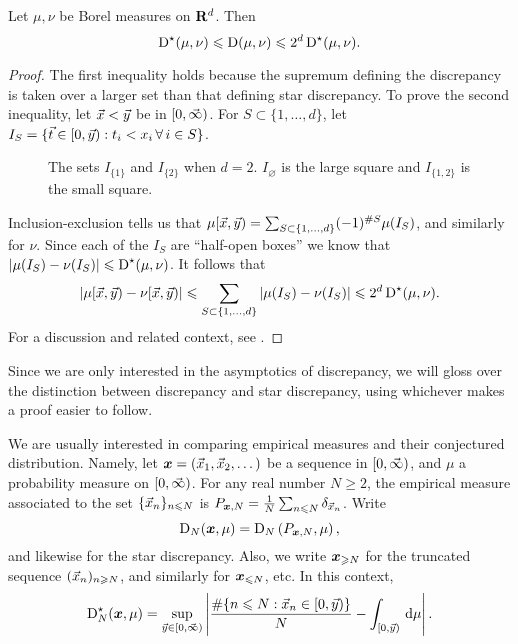\begin{lemma}
Let $\mu,\nu$ be Borel measures on $\mathbf{R}^d$. Then 
\[
	\operatorname{D}^\star(\mu,\nu) \leqslant \operatorname{D}(\mu,\nu) \leqslant 2^d \operatorname{D}^\star(\mu,\nu) .
\]
\end{lemma}
\begin{proof}
The first inequality holds because the supremum defining the discrepancy is 
taken over a larger set than that defining star discrepancy. To prove the 
second inequality, let $\vec{x}<\vec{y}$ be in $[0,\vec{\infty})$. For 
$S\subset \{1,\dots,d\}$, let 
$I_S = \{ \vec{t} \in [0,\vec{y}) : t_i < x_i \,\forall\,i\in S\}$.
\begin{figure}[h]
\caption{The sets $I_{\{1\}}$ and $I_{\{2\}}$ when $d = 2$. $I_\varnothing$ is 
the large square and $I_{\{1,2\}}$ is the small square.}
\centering
{}
\end{figure}
Inclusion-exclusion tells us that 
$\mu[\vec{x},\vec{y}) = \sum_{S\subset \{1,\dots,d\}} (-1)^{\# S} \mu(I_S)$, 
and similarly for $\nu$. Since each of the $I_S$ are ``half-open boxes'' 
we know that $|\mu(I_S) - \nu(I_S)| \leqslant \operatorname{D}^\star(\mu,\nu)$. It 
follows that 
\[
	|\mu[\vec{x},\vec{y}) - \nu[\vec{x},\vec{y})| \leqslant \sum_{S\subset \{1,\dots,d\}} |\mu(I_S) - \nu(I_S)| \leqslant 2^d \operatorname{D}^\star(\mu,\nu) .
\]
For a discussion and related context, see 
\cite[Ch.~2 Ex.~1.2]{kuipers-niederreiter-1974}. 
\end{proof}

Since we are only interested in the asymptotics of discrepancy, we will 
gloss over the distinction between discrepancy and star discrepancy, using 
whichever makes a proof easier to follow. 

We are usually interested in comparing empirical measures and their conjectured 
distribution. Namely, let ${\boldsymbol x} = (\vec{x}_1,\vec{x}_2,\dots)$ be a sequence in 
$[0,\vec{\infty})$, and $\mu$ a probability measure on $[0,\vec{\infty})$. For any real 
number $N\geqslant 2$, the empirical measure associated to the set 
$\{\vec{x}_n\}_{n\leqslant N}$ is 
$P_{{\boldsymbol x},N} = \frac{1}{N} \sum_{n\leqslant N} \delta_{\vec{x}_n}$. Write 
\[
	\operatorname{D}_N({\boldsymbol x},\mu) = \operatorname{D}_N\left( P_{{\boldsymbol x},N},\mu\right) ,
\]
and likewise for the star discrepancy. Also, we write 
${\boldsymbol x}_{\geqslant N}$ for the truncated sequence 
$(\vec{x}_n)_{n\geqslant N}$, and similarly for ${\boldsymbol x}_{\leqslant N}$, etc. In this 
context, 
\[
	\operatorname{D}^\star_N({\boldsymbol x},\mu) = \sup_{\vec{y}\in [0,\vec{\infty})} \left| \frac{\# \{n\leqslant N : \vec{x}_n \in [0,\vec{y})\}}{N} - \int_{[0,\vec{y})} \, \mathrm{d}\mu\right| .
\]

